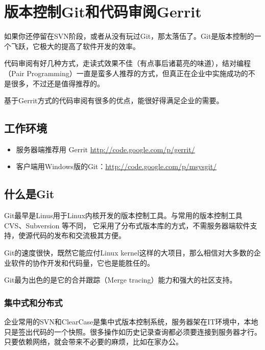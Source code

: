 \chapter{版本控制Git和代码审阅Gerrit}
\label{版本控制git和代码审阅gerrit}

如果你还停留在SVN阶段，或者从没有玩过Git，那太落伍了。Git是版本控制的一个飞跃，它极大的提高了软件开发的效率。

代码审阅有好几种方式，走读式效果不佳（有点事后诸葛亮的味道），结对编程（Pair Programming）一直是蛮多人推荐的方式，但真正在企业中实施成功的不是很多，不过还是值得推荐的。

基于Gerrit方式的代码审阅有很多的优点，能很好得满足企业的需要。

\section{工作环境}
\label{工作环境}

\begin{itemize}
\item 服务器端推荐用 Gerrit \href{http://code.google.com/p/gerrit/}{http:/\slash code.google.com\slash p\slash gerrit\slash }

\item 客户端用Windows版的Git：\href{http://code.google.com/p/msysgit/}{http:/\slash code.google.com\slash p\slash msysgit\slash }

\end{itemize}

\section{什么是Git}
\label{什么是git}

Git最早是Linus用于Linux内核开发的版本控制工具。与常用的版本控制工具 CVS、Subversion 等不同， 它采用了分布式版本库的方式，不需服务器端软件支持，使源代码的发布和交流极其方便。 

Git的速度很快，既然它能应付Linux kernel这样的大项目，那么相信对大多数的企业软件的协作开发和代码量，它也是能胜任的。

Git最为出色的是它的合并跟踪（Merge tracing）能力和强大的社区支持。

\subsection{集中式和分布式}
\label{集中式和分布式}

企业常用的SVN和ClearCase是集中式版本控制系统，服务器架在IT环境中，本地只是签出代码的一个快照。很多操作如历史记录查询都必须要连接到服务器才行。只要依赖网络，就会带来不必要的麻烦，比如在家办公。

